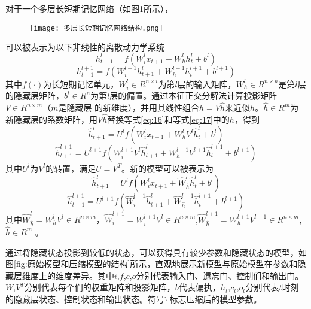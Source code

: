 对于一个多层长短期记忆网络（如图\ref{fig:LSTM}所示），
\begin{figure}[hbp]
  \centering
  \texttt{[image: 多层长短期记忆网络结构.png]}
  \label{fig:LSTM}
\end{figure}
可以被表示为以下非线性的离散动力学系统
\begin{equation}
\label{eq:16}
h_{t + 1}^l = f(W_i^l{x_{t + 1}} + W_h^lh_t^l + {b^l})
\end{equation}
\begin{equation}
\label{eq:17}
h_{t + 1}^{l + 1} = f(W_i^{l + 1}h_{t + 1}^l + W_h^{l + 1}h_t^{l + 1} + {b^{l + 1}})
\end{equation}
其中$f( \cdot )$为长短期记忆单元，$W_i^l \in {R^{n \times i}}$为第$l$层的输入矩阵，$W_h^l \in {R^{n \times n}}$是第$l$层的隐藏层矩阵，${b^l} \in {R^n}$为第$l$层的偏置。通过本征正交分解法计算投影矩阵$V \in {R^{n \times m}}$（$m$是隐藏层 的新维度），并用其线性组合$h = V\hat h$来近似$h$。$\hat h \in {R^m}$为新隐藏层的系数矩阵，用$V\hat h$替换等式\ref{eq:16}和等式\ref{eq:17}中的$h$，得到
\begin{equation}
  \label{eq:18}
  \hat h_{t + 1}^l = {U^l}f(W_i^l{x_{t + 1}} + W_h^l{V^l}\hat h_t^l + {b^l})
  \end{equation}
\begin{equation}
  \label{eq:19}
  \hat h_{t + 1}^{l + 1} = {U^{l + 1}}f(W_i^{l + 1}{V^l}\hat h_{t + 1}^l + W_h^{l + 1}{V^{l + 1}}\hat h_t^{l + 1} + {b^{l + 1}})
  \end{equation}
其中$U^l$为$V^l$的转置，满足$U=V^T$。新的模型可以被表示为
\begin{equation}
  \label{eq:20}
  \hat h_{t + 1}^l = {U^l}f(W_i^l{x_{t + 1}} + \hat W_{\hat h}^l\hat h_t^l + {b^l})
  \end{equation}
\begin{equation}
  \label{eq:21}
  \hat h_{t + 1}^{l + 1} = {U^{l + 1}}f(\hat W_i^{l + 1}\hat h_{t + 1}^l + \hat W_{\hat h}^{l + 1}\hat h_t^{l + 1} + {b^{l + 1}})
  \end{equation}
其中$\hat W_{\hat h}^l = W_h^l{V^l} \in {R^{n \times m}}$，$\hat W_i^{l + 1} = W_i^{l + 1}{V^l} \in {R^{n \times m}}$,$\hat W_{\hat h}^{l + 1} = W_h^{l + 1}{V^{l + 1}} \in {R^{n \times m}}$, $\hat h \in {R^m}$ 。

通过将隐藏状态投影到较低的状态，可以获得具有较少参数和隐藏状态的模型，如图\ref{fig:原始模型和压缩模型的结构}所示，直观地展示新模型与原始模型在参数和隐藏层维度上的维度差异。其中$i$,$f$,$c$,$o$分别代表输入门、遗忘门、控制们和输出门。$W$,$V^T$分别代表每个们的权重矩阵和投影矩阵，$b$代表偏执，$h_t$,$c_t$,$o_t$分别代表$t$时刻的隐藏层状态、控制状态和输出状态。符号$\hat  \cdot $标志压缩后的模型参数。

